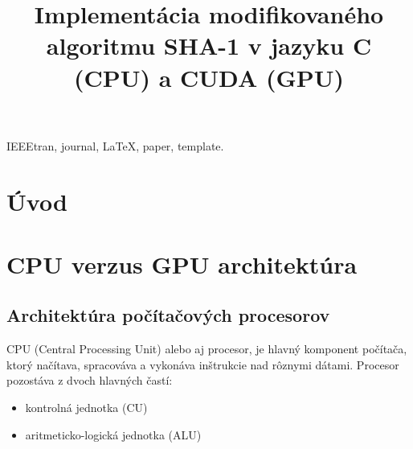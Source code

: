 \documentclass[conference]{IEEEtran}
\begin{document}
%
\title{Implementácia modifikovaného algoritmu SHA-1 v jazyku C (CPU) a CUDA (GPU)}

\author{
}


\maketitle

\begin{abstract}

\end{abstract}


\begin{IEEEkeywords}
IEEEtran, journal, \LaTeX, paper, template.
\end{IEEEkeywords}


\IEEEpeerreviewmaketitle


\section{Úvod}

\section{CPU verzus GPU architektúra}

\subsection{Architektúra počítačových procesorov}

CPU (Central Processing Unit) alebo aj procesor, je hlavný komponent počítača, ktorý načítava, spracováva a vykonáva inštrukcie nad rôznymi dátami. Procesor pozostáva z dvoch hlavných častí:

\begin{itemize}
	\item{kontrolná jednotka (CU)}
	\item{aritmeticko-logická jednotka (ALU)}
\end{itemize}
\end{document}
